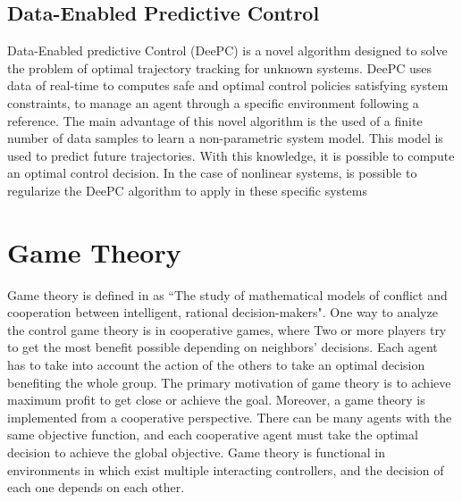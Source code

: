 





\subsection{Data-Enabled Predictive Control}

{\color{blue}
 Data-Enabled predictive Control (DeePC) is a novel algorithm designed to solve the problem of optimal trajectory tracking for unknown systems. DeePC uses data of real-time to computes safe and optimal control policies satisfying system constraints, to manage an agent through a specific environment following a reference. The main advantage of this novel algorithm is the used of a finite number of data samples to learn a non-parametric system model. This model is used to predict future trajectories. With this knowledge, it is possible to compute an optimal control decision. In the case of nonlinear systems, is possible to regularize the DeePC algorithm to apply in these specific systems
}

\section{Game Theory}

Game theory is defined in \cite{33t_GameTheory2} as ``The study of mathematical models of conflict and cooperation between intelligent, rational decision-makers". One way to analyze the control game theory is in cooperative games, where Two or more players try to get the most benefit possible depending on neighbors' decisions. Each agent has to take into account the action of the others to take an optimal decision benefiting the whole group. 
The primary motivation of game theory is to achieve maximum profit to get close or achieve the goal. Moreover, a game theory is implemented from a cooperative perspective. There can be many agents with the same objective function, and each cooperative agent must take the optimal decision to achieve the global objective. Game theory is functional in environments in which exist multiple interacting controllers, and the decision of each one depends on each other.

